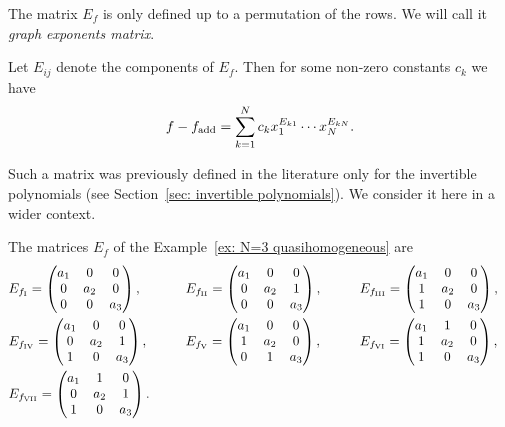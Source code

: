 \documentclass[pdftex]{sigma}
\numberwithin{equation}{section}
\begin{document}
The matrix $E_f$ is only defined up to a permutation of the rows. We will call it \textit{graph exponents matrix}.

Let $E_{ij}$ denote the components of $E_f$. Then for some non-zero constants $c_k$ we have
\begin{equation}\label{eq: poly from graph exponents matrix}
 	f - f_{\rm add} = \sum_{k=1}^N c_k x_1^{E_{k1}} \cdots x_N^{E_{kN}}.
\end{equation}

\begin{Remark}
	Such a matrix was previously defined in the literature only for the invertible polynomials (see Section~\ref{sec: invertible polynomials}). We consider it here in a wider context.
\end{Remark}

\begin{Example}
	The matrices $E_f$ of the Example~\ref{ex: N=3 quasihomogeneous} are
	\begin{alignat*}{4}
		& E_{f_{\rm I}} = \begin{pmatrix}
					a_1 & 0 & 0 \\ 0 & a_2 & 0 \\ 0 & 0 & a_3
		 \end{pmatrix},
		\qquad&&
		E_{f_{\rm II}} = \begin{pmatrix}
			a_1 & 0 & 0 \\ 0 & a_2 & 1 \\ 0 & 0 & a_3
			\end{pmatrix},
		\qquad&&
		E_{f_{\rm III}} = \begin{pmatrix}
			a_1 & 0 & 0 \\ 1 & a_2 & 0 \\ 1 & 0 & a_3
			\end{pmatrix},&
\\&		E_{f_{\rm IV}} = \begin{pmatrix}
			a_1 & 0 & 0 \\ 0 & a_2 & 1 \\ 1 & 0 & a_3
			\end{pmatrix},
		\qquad &&E_{f_{\rm V}} = \begin{pmatrix}
			a_1 & 0 & 0 \\ 1 & a_2 & 0 \\ 0 & 1 & a_3
			\end{pmatrix},
		\qquad&&
		E_{f_{\rm VI}} = \begin{pmatrix}
			a_1 & 1 & 0 \\ 1 & a_2 & 0 \\ 1 & 0 & a_3
			\end{pmatrix},&
		\\&
		E_{f_{\rm VII}} = \begin{pmatrix}
			a_1 & 1 & 0 \\ 0 & a_2 & 1 \\ 1 & 0 & a_3
			\end{pmatrix}.&&&&&
	\end{alignat*}
\end{Example}
\end{document}
